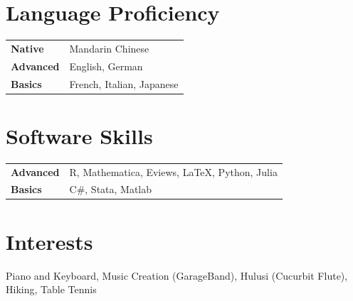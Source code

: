 \documentclass[a4paper,12pt]{article}
\begin{document}




\section{Language Proficiency}
\begin{tabularx}{\linewidth}{@{}l X@{}}
\textbf{Native} & \hfill  \normalsize{Mandarin Chinese}\\
\textbf{Advanced}  &  \hfill \normalsize{English, German}\\ 
\textbf{Basics}  & \hfill \normalsize{French, Italian, Japanese}\\ 
\end{tabularx}

\section{Software Skills}
\begin{tabularx}{\linewidth}{@{}l X@{}}
\textbf{Advanced}  &  \hfill \normalsize{R, Mathematica, Eviews, LaTeX, Python, Julia}\\ 
\textbf{Basics}  & \hfill \normalsize{C\#, Stata, Matlab}\\ 
\end{tabularx}

\section{Interests}

Piano and Keyboard, Music Creation (GarageBand), Hulusi (Cucurbit Flute), Hiking, Table Tennis



\end{document}

